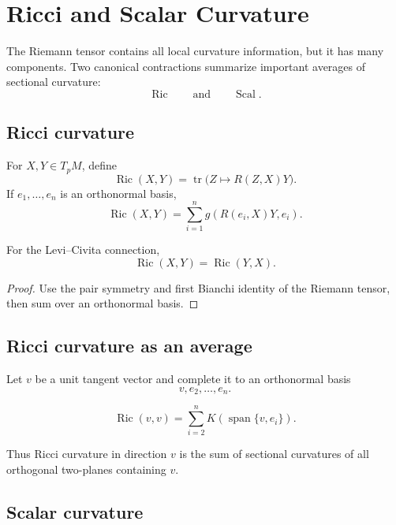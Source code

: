 \chapter{Ricci and Scalar Curvature}
\label{ch:vii27-ricci-scalar}

The Riemann tensor contains all local curvature information, but it has many
components.  Two canonical contractions summarize important averages of sectional
curvature:
\[
\boxed{\operatorname{Ric}\qquad\text{and}\qquad \operatorname{Scal}.}
\]

\section{Ricci curvature}

\begin{definition}\label{def:vii27-ricci}
For \(X,Y\in T_pM\), define
\[
\operatorname{Ric}(X,Y)
=
\operatorname{tr}\bigl(Z\mapsto R(Z,X)Y\bigr).
\]
If \(e_1,\dots,e_n\) is an orthonormal basis,
\[
\operatorname{Ric}(X,Y)
=
\sum_{i=1}^n g(R(e_i,X)Y,e_i).
\]
\end{definition}

\begin{proposition}[Symmetry]\label{prop:vii27-ricci-symmetric}
For the Levi--Civita connection,
\[
\operatorname{Ric}(X,Y)=\operatorname{Ric}(Y,X).
\]
\end{proposition}

\begin{proof}
Use the pair symmetry and first Bianchi identity of the Riemann tensor, then sum
over an orthonormal basis.
\end{proof}

\section{Ricci curvature as an average}

Let \(v\) be a unit tangent vector and complete it to an orthonormal basis
\[
v,e_2,\dots,e_n.
\]

\begin{proposition}\label{prop:vii27-ricci-sectional}
\[
\operatorname{Ric}(v,v)
=
\sum_{i=2}^n K(\operatorname{span}\{v,e_i\}).
\]
\end{proposition}

Thus Ricci curvature in direction \(v\) is the sum of sectional curvatures of all
orthogonal two-planes containing \(v\).

\section{Scalar curvature}

